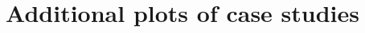 \documentclass[final,3p,times,twocolumn]{elsarticle}  %
\begin{document}

\clearpage

\section{Additional plots of case studies}
\label{app:plots}
\end{document}

